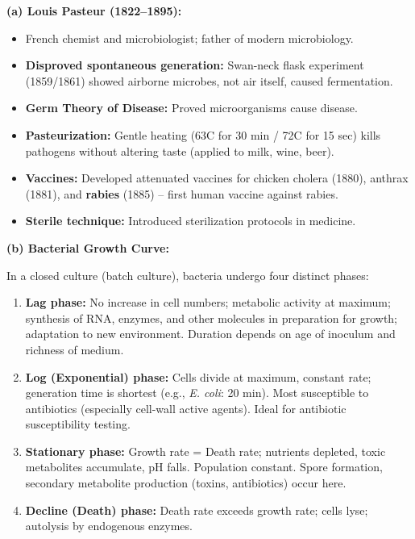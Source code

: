 \documentclass[11pt,a4paper]{article}
\begin{document}
\begin{ansbox}
\textbf{(a) Louis Pasteur (1822--1895):}
\begin{itemize}[leftmargin=*]
    \item French chemist and microbiologist; father of modern microbiology.
    \item \textbf{Disproved spontaneous generation:} Swan-neck flask experiment (1859/1861) showed airborne microbes, not air itself, caused fermentation.
    \item \textbf{Germ Theory of Disease:} Proved microorganisms cause disease.
    \item \textbf{Pasteurization:} Gentle heating (63\textdegree C for 30 min / 72\textdegree C for 15 sec) kills pathogens without altering taste (applied to milk, wine, beer).
    \item \textbf{Vaccines:} Developed attenuated vaccines for chicken cholera (1880), anthrax (1881), and \textbf{rabies} (1885) -- first human vaccine against rabies.
    \item \textbf{Sterile technique:} Introduced sterilization protocols in medicine.
\end{itemize}

\textbf{(b) Bacterial Growth Curve:}

In a closed culture (batch culture), bacteria undergo four distinct phases:
\begin{enumerate}[leftmargin=*]
    \item \textbf{Lag phase:} No increase in cell numbers; metabolic activity at maximum; synthesis of RNA, enzymes, and other molecules in preparation for growth; adaptation to new environment. Duration depends on age of inoculum and richness of medium.
    \item \textbf{Log (Exponential) phase:} Cells divide at maximum, constant rate; generation time is shortest (e.g., \textit{E. coli}: 20 min). Most susceptible to antibiotics (especially cell-wall active agents). Ideal for antibiotic susceptibility testing.
    \item \textbf{Stationary phase:} Growth rate = Death rate; nutrients depleted, toxic metabolites accumulate, pH falls. Population constant. Spore formation, secondary metabolite production (toxins, antibiotics) occur here.
    \item \textbf{Decline (Death) phase:} Death rate exceeds growth rate; cells lyse; autolysis by endogenous enzymes.
\end{enumerate}


\end{ansbox}
\end{document}
